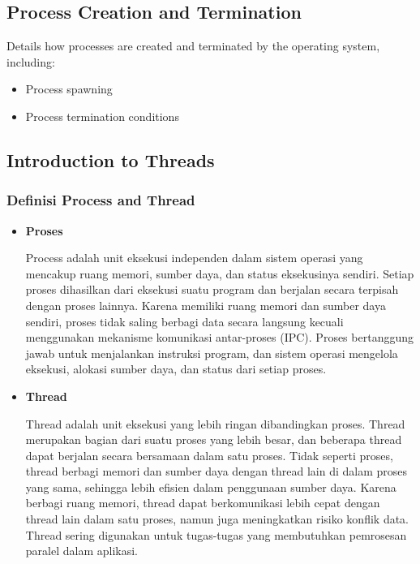 \documentclass[12pt]{article}
\begin{document}
\subsection{Process Creation and Termination}
Details how processes are created and terminated by the operating system, including:
\begin{itemize}
    \item Process spawning
    \item Process termination conditions
\end{itemize}

\subsection{Introduction to Threads}
    \subsubsection{Definisi Process and Thread}
    \begin{itemize}
            \item\textbf{Proses} 
            \par \hspace{2em} Process adalah unit eksekusi independen dalam sistem operasi yang mencakup ruang memori, sumber daya, dan status eksekusinya sendiri. Setiap proses dihasilkan dari eksekusi suatu program dan berjalan secara terpisah dengan proses lainnya. Karena memiliki ruang memori dan sumber daya sendiri, proses tidak saling berbagi data secara langsung kecuali menggunakan mekanisme komunikasi antar-proses (IPC). Proses bertanggung jawab untuk menjalankan instruksi program, dan sistem operasi mengelola eksekusi, alokasi sumber daya, dan status dari setiap proses. 
            
            \item\textbf{Thread}
            \par \hspace{2em} Thread adalah unit eksekusi yang lebih ringan dibandingkan proses. Thread merupakan bagian dari suatu proses yang lebih besar, dan beberapa thread dapat berjalan secara bersamaan dalam satu proses. Tidak seperti proses, thread berbagi memori dan sumber daya dengan thread lain di dalam proses yang sama, sehingga lebih efisien dalam penggunaan sumber daya. Karena berbagi ruang memori, thread dapat berkomunikasi lebih cepat dengan thread lain dalam satu proses, namun juga meningkatkan risiko konflik data. Thread sering digunakan untuk tugas-tugas yang membutuhkan pemrosesan paralel dalam aplikasi.
            \end{itemize}
            
\end{document}
